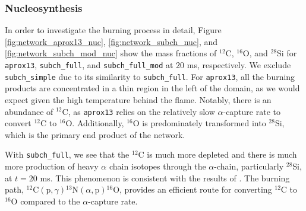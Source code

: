 \documentclass[preprint,times,tighten]{aastex631}
\begin{document}
\begin{figure*}
    \centering
    \caption{\label{fig:network_aprox13_nuc} Slice plots showing the mass fractions of ${}^{12}$C, ${}^{16}$O, and ${}^{28}$Si for {\tt aprox13} at 20 ms.}
\end{figure*}

\begin{figure*}
    \centering
    \caption{\label{fig:network_subch_nuc} Slice plots showing the mass fractions of ${}^{12}$C, ${}^{16}$O, and ${}^{28}$Si for {\tt subch\_full} at 20 ms.}
\end{figure*}

\begin{figure*}
    \centering
    \caption{\label{fig:network_subch_mod_nuc} Slice plots showing the mass fractions of ${}^{12}$C, ${}^{16}$O, and ${}^{28}$Si for {\tt subch\_full\_mod} at 20 ms.}
\end{figure*}

\subsubsection{Nucleosynthesis}

In order to investigate the burning process in detail, Figure \ref{fig:network_aprox13_nuc}, \ref{fig:network_subch_nuc}, and \ref{fig:network_subch_mod_nuc} show the mass fractions of ${}^{12}$C, ${}^{16}$O, and ${}^{28}$Si for {\tt aprox13}, {\tt subch\_full}, and {\tt subch\_full\_mod} at 20 ms, respectively. We exclude {\tt subch\_simple} due to its similarity to {\tt subch\_full}.  For {\tt aprox13}, all the burning products are concentrated in a thin region in the left of the domain, as we would expect
given the high temperature behind the flame.  Notably, there is an abundance of ${}^{12}$C, as {\tt aprox13} relies on the relatively slow $\alpha$-capture rate to convert ${}^{12}$C to ${}^{16}$O. Additionally, ${}^{16}$O is predominately transformed into ${}^{28}$Si, which is the primary end product of the network.


With {\tt subch\_full}, we see that the ${}^{12}$C is much more depleted and there is much more production of heavy $\alpha$ chain isotopes through the $\alpha$-chain, particularly ${}^{28}$Si, at $t = 20$ ms. This phenomenon is consistent with the results of \cite{Weinberg_2006}. The burning path, ${}^{12}\mbox{C}(\mbox{p}, \gamma) {}^{13}\mbox{N}(\alpha, \mbox{p}){}^{16}\mbox{O}$, provides an efficient route for converting ${}^{12}$C to ${}^{16}$O compared to the $\alpha$-capture rate. 
\end{document}
